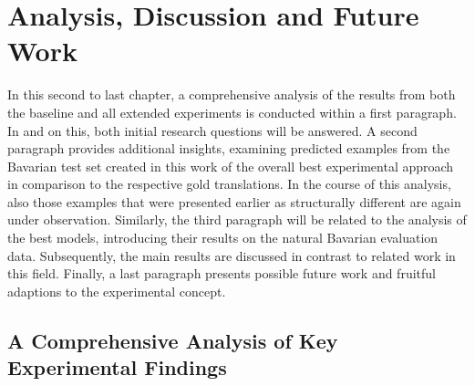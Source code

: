 \documentclass[11pt,a4paper,twoside,openright]{scrbook}
\begin{document}
\chapter{Analysis, Discussion and Future Work} 

In this second to last chapter, a comprehensive analysis of the results from both the baseline and all extended experiments is conducted within a first paragraph. In and on this, both initial research questions will be answered. A second paragraph provides additional insights, examining predicted examples from the Bavarian test set created in this work of the overall best experimental approach in comparison to the respective gold translations. In the course of this analysis, also those examples that were presented earlier as structurally different are again under observation. Similarly, the third paragraph will be related to the analysis of the best models, introducing their results on the natural Bavarian evaluation data. Subsequently, the main results are discussed in contrast to related work in this field. Finally, a last paragraph presents possible future work and fruitful adaptions to the experimental concept.






\section{A Comprehensive Analysis of Key Experimental Findings}
\end{document}
